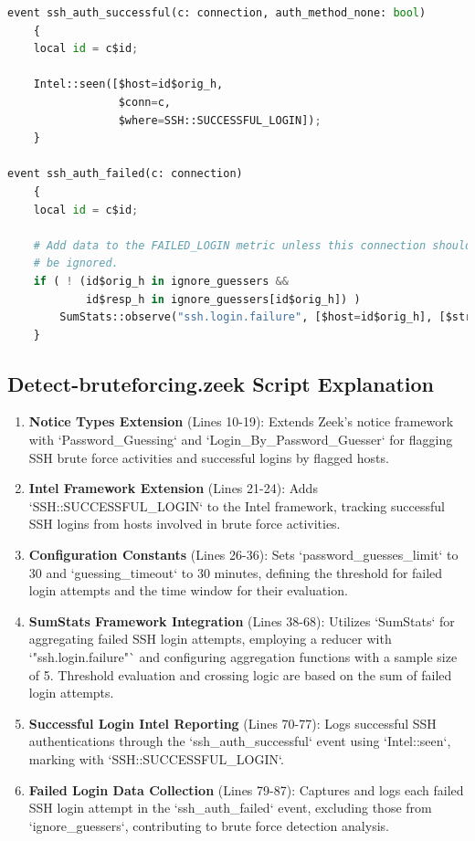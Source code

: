\begin{lstlisting}[language=Python, caption=detect-bruteforcing.zeek]
event ssh_auth_successful(c: connection, auth_method_none: bool)
	{
	local id = c$id;

	Intel::seen([$host=id$orig_h,
	             $conn=c,
	             $where=SSH::SUCCESSFUL_LOGIN]);
	}

event ssh_auth_failed(c: connection)
	{
	local id = c$id;

	# Add data to the FAILED_LOGIN metric unless this connection should
	# be ignored.
	if ( ! (id$orig_h in ignore_guessers &&
	        id$resp_h in ignore_guessers[id$orig_h]) )
		SumStats::observe("ssh.login.failure", [$host=id$orig_h], [$str=cat(id$resp_h)]);
	}

\end{lstlisting}


\subsection{Detect-bruteforcing.zeek Script Explanation}
\begin{enumerate}
    \item \textbf{Notice Types Extension} (Lines 10-19): Extends Zeek's notice framework with `Password\_Guessing` and `Login\_By\_Password\_Guesser` for flagging SSH brute force activities and successful logins by flagged hosts.
    
    \item \textbf{Intel Framework Extension} (Lines 21-24): Adds `SSH::SUCCESSFUL\_LOGIN` to the Intel framework, tracking successful SSH logins from hosts involved in brute force activities.
    
    \item \textbf{Configuration Constants} (Lines 26-36): Sets `password\_guesses\_limit` to 30 and `guessing\_timeout` to 30 minutes, defining the threshold for failed login attempts and the time window for their evaluation.
    
    \item \textbf{SumStats Framework Integration} (Lines 38-68): Utilizes `SumStats` for aggregating failed SSH login attempts, employing a reducer with `"ssh.login.failure"` and configuring aggregation functions with a sample size of 5. Threshold evaluation and crossing logic are based on the sum of failed login attempts.
    
    \item \textbf{Successful Login Intel Reporting} (Lines 70-77): Logs successful SSH authentications through the `ssh\_auth\_successful` event using `Intel::seen`, marking with `SSH::SUCCESSFUL\_LOGIN`.
    
    \item \textbf{Failed Login Data Collection} (Lines 79-87): Captures and logs each failed SSH login attempt in the `ssh\_auth\_failed` event, excluding those from `ignore\_guessers`, contributing to brute force detection analysis.
\end{enumerate}
